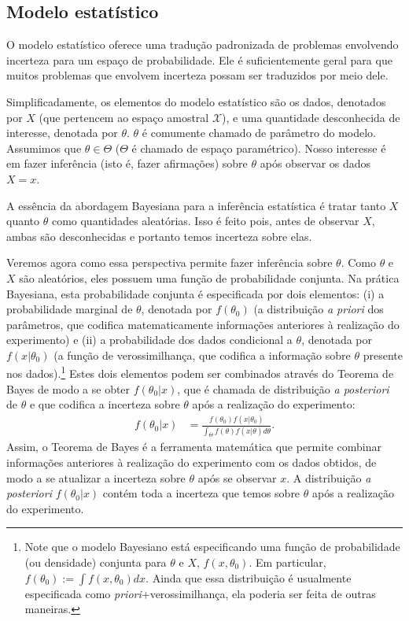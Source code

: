 \subsection{Modelo estatístico}
\label{section:stat_model}

O modelo estatístico oferece uma 
tradução padronizada de problemas envolvendo incerteza
para um espaço de probabilidade.
Ele é suficientemente geral para que 
muitos problemas que envolvem incerteza possam 
ser traduzidos por meio dele.

Simplificadamente, os elementos do modelo estatístico são
os dados, denotados por $X$ (que pertencem ao espaço amostral $\mathcal{X}$), e 
uma quantidade desconhecida de interesse, denotada por
$\theta$. $\theta$ é comumente chamado de 
parâmetro do modelo.
Assumimos que $\theta \in \Theta$ ($\Theta$ é chamado de espaço paramétrico).
Nosso interesse é em fazer inferência (isto é, fazer afirmações) sobre $\theta$ após observar os dados $X=x$.


A essência da abordagem Bayesiana
para a inferência estatística
é tratar tanto $X$ quanto $\theta$ como
quantidades aleatórias. 
Isso é feito pois,  antes de observar $X$, ambas são
desconhecidas
e portanto temos incerteza sobre elas.

Veremos agora como essa perspectiva permite fazer  inferência sobre $\theta$.
Como $\theta$ e $X$
são aleatórios,
eles possuem uma função de
probabilidade 
conjunta.
Na prática Bayesiana, esta probabilidade conjunta é especificada
por dois elementos:
(i) a
probabilidade marginal de $\theta$,
denotada por $f(\theta_{0})$ 
(a distribuição \emph{a priori} dos parâmetros, que codifica matematicamente informações anteriores à realização do experimento) e (ii)
a
probabilidade dos dados condicional a $\theta$, denotada por $f(x|\theta_{0})$ (a função de verossimilhança, que codifica a informação sobre $\theta$ presente nos dados).\footnote{Note que o modelo Bayesiano está
especificando
uma função de
probabilidade (ou densidade) conjunta para 
$\theta$ e $X$, $f(x,\theta_{0})$. Em particular, $f(\theta_{0}) := \int{f(x,\theta_{0})dx}$. Ainda que essa distribuição é usualmente especificada como \emph{priori}+verossimilhança, ela poderia ser feita de outras maneiras.}
Estes dois elementos podem ser combinados através do Teorema de Bayes
de modo a se obter  $f(\theta_{0}|x)$, que é chamada de distribuição 
\emph{a posteriori} de $\theta$ e que codifica  a incerteza sobre $\theta$ após a realização do experimento: 
\begin{align}
 \label{eqn:bayes}
 f(\theta_{0}|x)
 &= \frac{f(\theta_{0})f(x|\theta_{0})}
 {\int_{\Theta}{f(\theta)f(x|\theta)d\theta}}.
\end{align}
Assim, o Teorema de Bayes é a ferramenta matemática que permite combinar  informações anteriores à realização do experimento
com os dados obtidos, de modo a se atualizar a incerteza sobre $\theta$ após se observar $x$.
A distribuição \emph{a posteriori} $f(\theta_{0}|x)$
contém toda a incerteza que temos
sobre $\theta$ após a realização do experimento.

